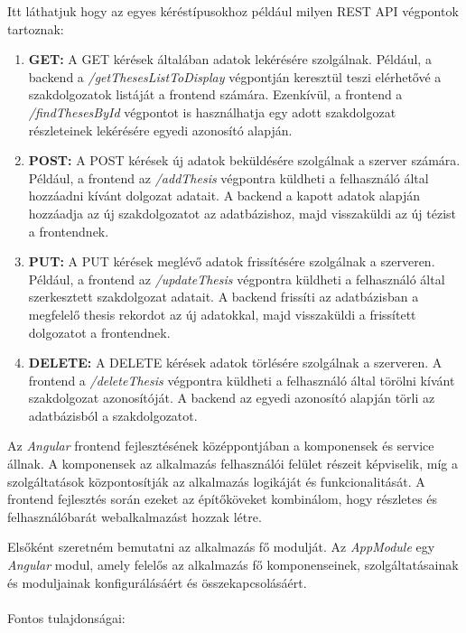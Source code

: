 Itt láthatjuk hogy az egyes kéréstípusokhoz például milyen REST API végpontok tartoznak:

\begin{enumerate}

\item{\textbf{GET:}}
A GET kérések általában adatok lekérésére szolgálnak. Például, a backend a \textit{/getThesesListToDisplay} végpontján keresztül teszi elérhetővé a szakdolgozatok listáját a frontend számára. Ezenkívül, a frontend a \textit{/findThesesById} végpontot is használhatja egy adott szakdolgozat részleteinek lekérésére egyedi azonosító alapján.

\item{\textbf{POST:}}
A POST kérések új adatok beküldésére szolgálnak a szerver számára. Például, a frontend az \textit{/addThesis} végpontra küldheti a felhasználó által hozzáadni kívánt dolgozat adatait. A backend a kapott adatok alapján hozzáadja az új szakdolgozatot az adatbázishoz, majd visszaküldi az új tézist a frontendnek.

\item{\textbf{PUT:}}
A PUT kérések meglévő adatok frissítésére szolgálnak a szerveren. Például, a frontend az \textit{/updateThesis} végpontra küldheti a felhasználó által szerkesztett szakdolgozat adatait. A backend frissíti az adatbázisban a megfelelő thesis rekordot az új adatokkal, majd visszaküldi a frissített dolgozatot a frontendnek.

\item{\textbf{DELETE:}}
A DELETE kérések adatok törlésére szolgálnak a szerveren. A frontend a \textit{/deleteThesis} végpontra küldheti a felhasználó által törölni kívánt szakdolgozat azonosítóját. A backend az egyedi azonosító alapján törli az adatbázisból a szakdolgozatot.

\end{enumerate}



Az \textit{Angular} \cite{angular} frontend fejlesztésének középpontjában a komponensek és service állnak. A komponensek az alkalmazás felhasználói felület részeit képviselik, míg a szolgáltatások központosítják az alkalmazás logikáját és funkcionalitását. A frontend fejlesztés során ezeket az építőköveket kombinálom, hogy részletes és felhasználóbarát webalkalmazást hozzak létre.

Elsőként szeretném bemutatni az alkalmazás fő modulját. Az \textit{AppModule} egy \textit{Angular} modul, amely felelős az alkalmazás fő komponenseinek, szolgáltatásainak és moduljainak konfigurálásáért és összekapcsolásáért. \\
\\Fontos tulajdonságai:

